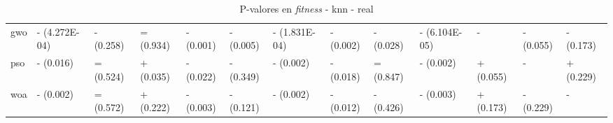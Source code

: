 \begin{table}
\begin{adjustbox}{width=\linewidth}
\begin{tabular}{lllllllllllll}
            gwo   & - (4.272E-04) & - (0.258)     & = (0.934)     & - (0.001) & - (0.005)     & - (1.831E-04) & - (0.002)     & - (0.028) & - (6.104E-05) & -             & - (0.055) & - (0.173) \\
            pso   & - (0.016)     & = (0.524)     & + (0.035)     & - (0.022) & - (0.349)     & - (0.002)     & - (0.018)     & = (0.847) & - (0.002)     & + (0.055)     & -         & + (0.229) \\
            woa   & - (0.002)     & = (0.572)     & + (0.222)     & - (0.003) & - (0.121)     & - (0.002)     & - (0.012)     & - (0.426) & - (0.003)     & + (0.173)     & - (0.229) & -         \\
            \bottomrule
        \end{tabular}
    \end{adjustbox}
    \caption{P-valores en \textit{fitness} - knn - real}
    \label{tab:p_values_fitness_real_knn}
\end{table}

